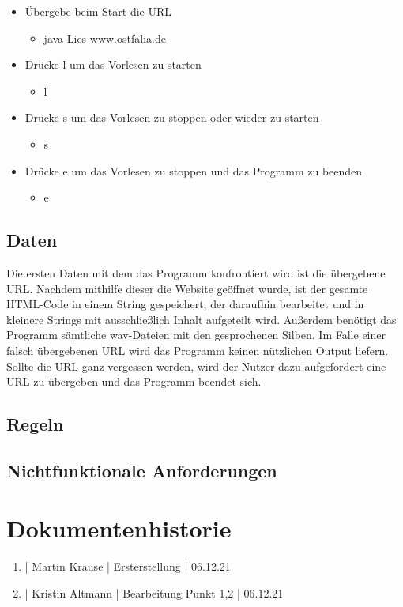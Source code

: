\documentclass[11pt]{scrartcl}
\begin{document}
\begin{itemize}
	\item Übergebe beim Start die URL
\begin{itemize}
	\item java Lies www.ostfalia.de
\end{itemize}
\end{itemize}

\begin{itemize}
	\item Drücke l um das Vorlesen zu starten
\begin{itemize}
	\item l
\end{itemize}
\end{itemize}

\begin{itemize}
	\item Drücke s um das Vorlesen zu stoppen oder wieder zu starten
\begin{itemize}
	\item s
\end{itemize}
\end{itemize}

\begin{itemize}
	\item Drücke e um das Vorlesen zu stoppen und das Programm zu beenden
\begin{itemize}
	\item e
\end{itemize}
\end{itemize}

\subsection{Daten}
Die ersten Daten mit dem das Programm konfrontiert wird ist die übergebene URL. Nachdem mithilfe dieser
die Website geöffnet wurde, ist der gesamte HTML-Code in einem String gespeichert, der daraufhin bearbeitet
und in kleinere Strings mit ausschließlich Inhalt aufgeteilt wird. Außerdem benötigt das Programm sämtliche
wav-Dateien mit den gesprochenen Silben. Im Falle einer falsch übergebenen URL wird das Programm keinen nützlichen Output liefern. Sollte die URL ganz vergessen werden, wird der Nutzer dazu aufgefordert eine URL zu übergeben und das Programm beendet sich.


\subsection{Regeln}


\subsection{Nichtfunktionale Anforderungen}


\section{Dokumentenhistorie}

\begin{enumerate}
	\item | Martin Krause | Ersterstellung | 06.12.21
	\item | Kristin Altmann | Bearbeitung Punkt 1,2  | 06.12.21
\end{enumerate}
 
\end{document}

